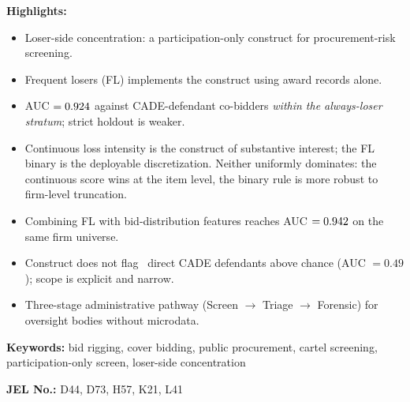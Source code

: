 \noindent\textbf{Highlights:}
\begin{itemize}\setlength{\itemsep}{1pt}
\item Loser-side concentration: a participation-only construct for procurement-risk screening.
\item Frequent losers (FL) implements the construct using award records alone.
\item AUC $=0.924$ against \valCobidders CADE-defendant co-bidders \emph{within the always-loser stratum}; strict holdout is weaker.
\item Continuous loss intensity is the construct of substantive interest; the FL binary is the deployable discretization. Neither uniformly dominates: the continuous score wins at the item level, the binary rule is more robust to firm-level truncation. %
\item Combining FL with bid-distribution features reaches AUC $=0.942$ on the same firm universe.
\item Construct does not flag \valDirectCADE\ direct CADE defendants above chance (AUC $= 0.49$); scope is explicit and narrow.
\item Three-stage administrative pathway (Screen $\to$ Triage $\to$ Forensic) for oversight bodies without microdata.
\end{itemize}

\bigskip

\noindent\textbf{Keywords:} bid rigging, cover bidding, public procurement, cartel screening, participation-only screen, loser-side concentration

\noindent\textbf{JEL No.:} D44, D73, H57, K21, L41

\bigskip
